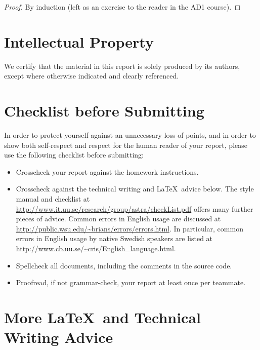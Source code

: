 \documentclass[a4paper,11pt]{article}
\begin{document}
\begin{proof}
  By induction (left as an exercise to the reader in the AD1 course).
\end{proof}

\section*{Intellectual Property}

We certify that the material in this report is solely produced by its
authors, except where otherwise indicated and clearly referenced.





\newpage
\section*{Checklist before Submitting}

In order to protect yourself against an unnecessary loss of points,
and in order to show both self-respect and respect for the human
reader of your report, please use the following checklist before
submitting:
\begin{itemize}
\item Crosscheck your report against the homework instructions.
\item Crosscheck against the technical writing and \LaTeX\ advice
  below.  The style manual and checklist at
  \url{http://www.it.uu.se/research/group/astra/checkList.pdf} offers
  many further pieces of advice.  Common errors in English usage are
  discussed at \url{http://public.wsu.edu/~brians/errors/errors.html}.
  In particular, common errors in English usage by native Swedish
  speakers are listed at
  \url{http://www.cb.uu.se/~cris/English_language.html}.
\item Spellcheck all documents, including the comments in the source
  code.
\item Proofread, if not grammar-check, your report at least once per
  teammate.
\end{itemize}

\section{More \LaTeX\ and Technical Writing Advice}
\end{document}
